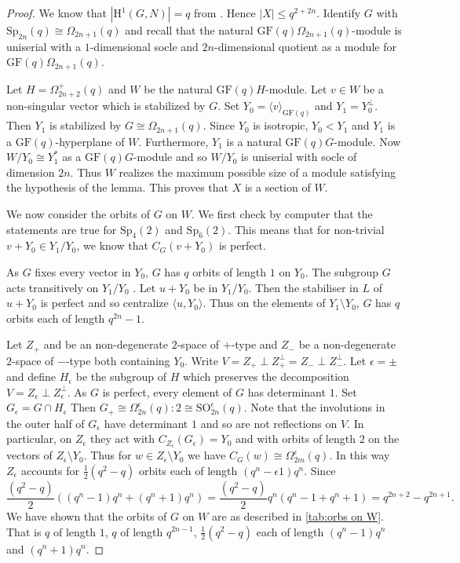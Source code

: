 \documentclass[12pt]{amsart}
\theoremstyle{remark}
\theoremstyle{notation}
\theoremstyle{definition}
\newcommand{\GF}{\mathrm{GF}}
\newcommand{\Sp}{\mathrm{Sp}}
\newcommand{\0}{\emptyset}
\newcommand{\SO}{\mathrm{SO}}
\begin{document}
\begin{proof}
We know that $|\mathrm H^1(G,N)|=q$ from \cite[Table B]{JonesParshall}. Hence $|X| \le  q^{2+2n}$. Identify $G$ with  $\Sp_{2n}(q) \cong \Omega_{2n+1}(q)$ and recall that the natural $\GF(q)\Omega_{2n+1}(q)$-module is uniserial with a $1$-dimensional socle and $2n$-dimensional quotient   as a module for $\GF(q)\Omega_{2n+1}(q)$.


Let $H= \Omega_{2n+2}^+(q)$  and $W$ be
 the natural $\GF(q)H$-module.  Let $v \in W$ be a non-singular vector which is stabilized by  $G$. Set $Y_0=\langle v \rangle_{\GF(q)}$ and $Y_1=Y_0^\perp$. Then $Y_1$ is stabilized by $G \cong \Omega_{2n+1}(q)$.  Since $Y_0$ is isotropic, $Y_0<Y_1$ and $Y_1$ is a $\GF(q)$-hyperplane of $W$. Furthermore, $Y_1$ is a  natural $\GF(q)G$-module.  Now $W/Y_0 \cong  Y_1^*$ as a $\GF(q)G$-module and so  $W/Y_0  $ is uniserial with socle of dimension $2n$.
 Thus $W$ realizes the maximum possible size  of a module satisfying the hypothesis of the lemma. This proves that $X$ is a section of $W$.

 We now consider the orbits of $G$ on $W$. We first check by computer that the statements are true for $\Sp_4(2)$ and $\Sp_6(2)$. This means that for non-trivial $v+Y_0\in Y_1/Y_0$, we know that $C_G(v+Y_0)$ is perfect.

 As $G$ fixes every vector in $Y_0$, $G$ has $q$ orbits of length $1$ on $Y_0$. The subgroup $G$ acts transitively on  $Y_1/Y_0$ . Let $u+Y_0$ be in $Y_1/Y_0$.  Then the stabiliser in $L$ of $u+Y_0$ is perfect and so centralize $\langle u,Y_0\rangle$. Thus on the elements of $Y_1\setminus Y_0$, $G$ has  $q$ orbits each of length $q^{2n}-1$.

  Let $Z_+$ and be an non-degenerate $2$-space of $+$-type and $Z_-$  be a  non-degenerate $2$-space of $-$-type both containing $Y_0$. Write $V= Z_+\perp  Z_+^\perp= Z_-\perp  Z_-^\perp$. Let $\epsilon =\pm$ and define $H_\epsilon$ be the subgroup  of $H$ which preserves the decomposition $V= Z_\epsilon\perp  Z_\epsilon^\perp$.  As $G$ is perfect, every element of $G$ has determinant $1$.  Set $G_\epsilon =G\cap H_\epsilon$   Then $G_+\cong \Omega_{2n}^\epsilon(q){:}2\cong \SO_{2n}^\epsilon(q)$. Note that    the involutions in the outer half of $G_\epsilon$ have determinant $1$ and so are not reflections on $V$. In particular, on $Z_\epsilon$   they act with $C_{Z_\epsilon}(G_\epsilon)= Y_0$ and with orbits of length $2$ on the vectors of $Z_\epsilon\setminus Y_0$.  Thus for $w \in Z_\epsilon\setminus Y_0$ we have $C_G(w) \cong \Omega_{2m}^\epsilon(q)$.  In this way $Z_\epsilon$ accounts for $\frac{1}{2}(q^2-q)$ orbits each of length $(q^{n}-\epsilon 1)q^n$.  Since $$\frac{(q^2-q)}{2}\left((q^{n}- 1)q^n+ (q^{n}+ 1)q^n\right)=
  \frac{(q^2-q)}{2}q^n(q^n-1+q^n+1)=
  q^{2n+2}-q^{2n+1}.$$
  We have shown that the orbits of $G$ on $W$ are as described in \cref{tab:orbs on W}. That is $q$ of length $1$, $q$ of length $q^{2n-1}$, $\frac{1}2(q^2-q)$ each of length $(q^n- 1)q^n$ and $(q^n+ 1)q^n$.
  \end{proof}
\end{document}
